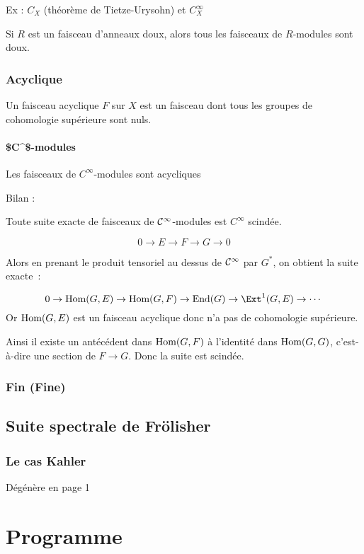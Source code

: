 Ex : $C_X$ (théorème de Tietze-Urysohn) et $C_X^\infty$

Si $R$ est un faisceau d'anneaux doux, alors tous les faisceaux de $R$-modules sont doux.

\subsection{Acyclique}
\begin{defi}
Un faisceau acyclique $F$ sur  $X$ est un faisceau dont tous les groupes de cohomologie supérieure sont nuls.
\end{defi}

\subsubsection{\$C\^\infty\$-modules}
Les faisceaux de $C^\infty$-modules sont acycliques

Bilan : 
\begin{prop}
Toute suite exacte de faisceaux de $\mathcal{C}^\infty$-modules est $C^\infty$ scindée.
\end{prop}

\[
0 \rightarrow E \rightarrow F \rightarrow G \rightarrow 0
\]

Alors en prenant le produit tensoriel au dessus de $\mathcal{C}^\infty$ par $G^*$, on obtient la suite exacte~:

\[
0 \rightarrow \Hom(G,E) \rightarrow \Hom(G,F) \rightarrow \End(G) \rightarrow \Ext^1(G,E) \rightarrow \cdots
\]
Or $\text{Hom}(G,E)$ est un faisceau acyclique donc n'a pas de cohomologie supérieure.

Ainsi il existe un antécédent dans $\text{Hom}(G,F)$ à l'identité dans $\text{Hom}(G,G)$, c'est-à-dire une section de $F \rightarrow G$. Donc la suite est scindée.

\subsection{Fin (Fine)}

\section{Suite spectrale de Frölisher}

\subsection{Le cas Kahler}
Dégénère en page 1

\chapter{Programme}
